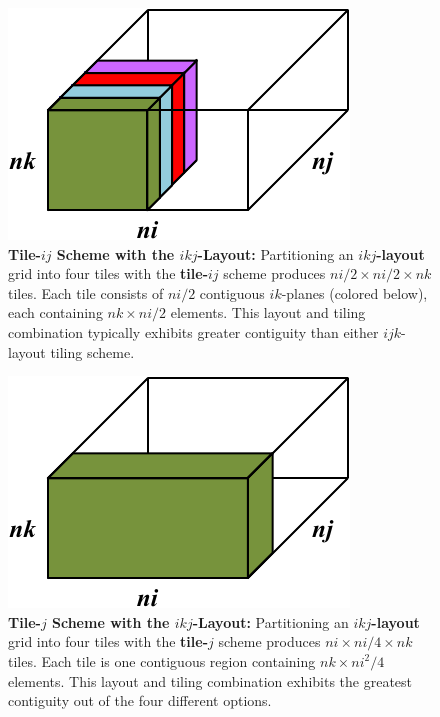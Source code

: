 \documentclass{sig-alternate-05-2015}
\begin{document}
\begin{figure}[!bt]
  \centering
  \caption{
    \textbf{Tile-\(ij\) Scheme with the \(ikj\)-Layout:}
    Partitioning an \textbf{\(ikj\)-layout} grid into four tiles with the
      \textbf{tile-\(ij\)} scheme produces \(ni/2 \times ni/2 \times nk\) tiles.
    Each tile consists of \(ni/2\) contiguous \(ik\)-planes (colored
      below), each containing \(nk \times ni/2\) elements.
    This layout and tiling combination typically exhibits greater contiguity
      than either \(ijk\)-layout tiling scheme.
  }
  \label{fig:implementation:tiling:ikj_layout_tile_ij}
  \includegraphics[width=0.70\columnwidth]{figures/ikj_layout_tile_ij_scheme.pdf}
  \vspace{-.5cm}
\end{figure}

\begin{figure}[!bt]
  \centering
  \caption{
    \textbf{Tile-\(j\) Scheme with the \(ikj\)-Layout:}
    Partitioning an \textbf{\(ikj\)-layout} grid into four tiles with the
      \textbf{tile-\(j\)} scheme produces \(ni \times ni/4 \times nk\) tiles.
    Each tile is one contiguous region containing \(nk \times ni^2/4\) elements.
    This layout and tiling combination exhibits the greatest contiguity out of
      the four different options.
  }
  \label{fig:implementation:tiling:ikj_layout_tile_j}
  \includegraphics[width=0.70\columnwidth]{figures/ikj_layout_tile_j_scheme.pdf}
  \vspace{-.5cm}
\end{figure}
\end{document}

